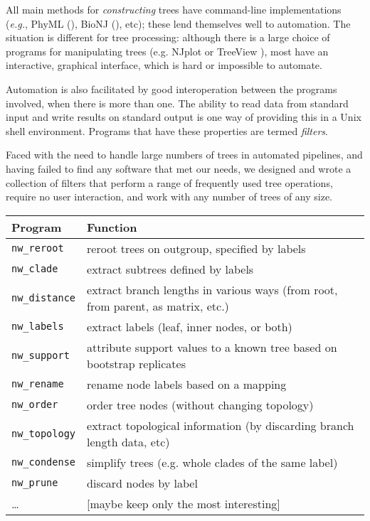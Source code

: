 \documentclass{bioinfo}
\newcommand{\unix}{Unix}
\newcommand{\prog}[1]{\texttt{nw\_#1}}
\newcommand{\nutils}{Newick Utilities}
\newcommand{\unix}{\textsc{Unix}}
\begin{document}
All main methods for \textit{constructing} trees have command-line implementations (\textit{e.g.}, PhyML (\cite{Guindon2003}), BioNJ (\cite{Gascuel1997}), etc); these lend themselves well to automation. 
The situation is different for tree processing: although there is a large choice of programs for manipulating trees (e.g.
NJplot \cite{Perrière1996} or TreeView \cite{Page2002}), most have an interactive, graphical interface, which is hard or impossible to automate.

Automation is also facilitated by good interoperation between the programs involved, when there is more than one. The ability to read data from standard input and write results on standard output is one way of providing this in a \unix{} shell environment. Programs that have these properties are termed \textit{filters}.

Faced with the need to handle large numbers of trees in automated pipelines, and having failed to find any software that met our needs, we designed and wrote a collection of filters that perform a range of frequently used tree operations, require no user interaction, and work with any number of trees of any size. 

\begin{table}[!t]
\processtable{\nutils\label{tab:NU_func}}
{\begin{tabular*}{\columnwidth}{lp{}}\toprule
Program & Function \\ 
\hline 
\prog{reroot} & reroot trees on outgroup, specified by labels \\
\prog{clade} & extract subtrees defined by labels \\
\prog{distance} & extract branch lengths in various ways (from root, from parent, as matrix, etc.) \\
\prog{labels} & extract labels (leaf, inner nodes, or both) \\
\prog{support} & attribute support values to a known tree based on bootstrap replicates \\
\prog{rename} & rename node labels based on a mapping \\
\prog{order} & order tree nodes (without changing topology) \\
\prog{topology} & extract topological information (by discarding branch length data, etc) \\
\prog{condense} & simplify trees (e.g. whole clades of the same label) \\
\prog{prune} & discard nodes by label \\
 \ldots & [maybe keep only the most interesting] \\
\hline
\end{tabular*}}{}
\end{table}
\end{document}
